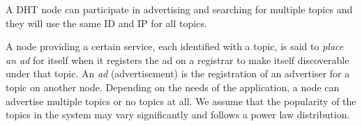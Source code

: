 A DHT node can participate in advertising and searching for multiple topics and they will use the same ID and IP for all topics.

A node providing a certain service,  each identified with a topic, is said to \emph{place an ad} for itself when it registers the ad on a registrar to make itself discoverable under that topic. 
An \emph{ad} (\ie advertisement) is the registration of an advertiser for a topic on another node. 
Depending on the needs of the application, a node can advertise multiple topics or no topics at all. 
We assume that the popularity of the topics in the system may vary significantly and follows a power law distribution.


